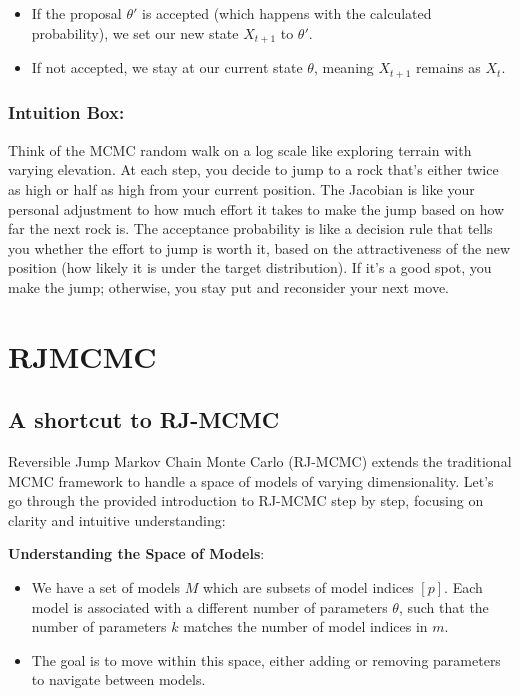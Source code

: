 \documentclass[10pt]{article}
\begin{document}
\begin{enumerate}
  \begin{itemize}
    \item If the proposal \( \theta' \) is accepted (which happens with the calculated probability), we set our new state \( X_{t+1} \) to \( \theta' \).
    \item If not accepted, we stay at our current state \( \theta \), meaning \( X_{t+1} \) remains as \( X_t \).
  \end{itemize}
\end{enumerate}

\subsubsection*{Intuition Box:}
Think of the MCMC random walk on a log scale like exploring terrain with varying elevation. At each step, you decide to jump to a rock that's either twice as high or half as high from your current position. The Jacobian is like your personal adjustment to how much effort it takes to make the jump based on how far the next rock is. The acceptance probability is like a decision rule that tells you whether the effort to jump is worth it, based on the attractiveness of the new position (how likely it is under the target distribution). If it's a good spot, you make the jump; otherwise, you stay put and reconsider your next move.

\section*{RJMCMC}

\subsection*{A shortcut to RJ-MCMC}
Reversible Jump Markov Chain Monte Carlo (RJ-MCMC) extends the traditional MCMC framework to handle a space of models of varying dimensionality. Let's go through the provided introduction to RJ-MCMC step by step, focusing on clarity and intuitive understanding:

\textbf{Understanding the Space of Models}:

\begin{itemize}
  \item We have a set of models \( M \) which are subsets of model indices \( [p] \). Each model is associated with a different number of parameters \( \theta \), such that the number of parameters \( k \) matches the number of model indices in \( m \).
  \item The goal is to move within this space, either adding or removing parameters to navigate between models.
\end{itemize}
\end{document}
